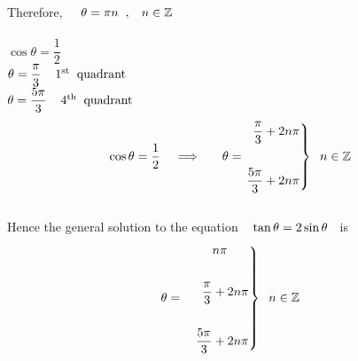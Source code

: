 \documentclass[11pt,a4paper]{article}
\begin{document}
Therefore, $\hspace{0.4cm} \theta = \pi n \hspace{0.2cm}, \hspace{0.3cm} n \in \mathbb{Z}$\\\\




$\cos \theta = \dfrac{1}{2}$\\

$\theta = \dfrac{\pi}{3}\hspace{0.4cm}1^{\text{st}}\hspace{0.2cm}\text{quadrant}$\\

$\theta = \dfrac{5\pi}{3}\hspace{0.4cm}4^{\text{th}}\hspace{0.2cm}\text{quadrant}$\\

$$\cos \theta = \dfrac{1}{2} \hspace{0.3cm} \implies \hspace{0.5cm} \theta = 
\left.\begin{aligned}
\dfrac{\pi}{3} & + 2n\pi\\\\
\dfrac{5\pi}{3} & + 2n\pi\\
\end{aligned}
\right\}\hspace{0.2cm} n \in \mathbb{Z}$$\\




Hence the general solution to the equation $\hspace{0.3cm} \tan \theta = 2\sin \theta\hspace{0.2cm}$ is 
\[\theta = \hspace{0.3cm} \left.\begin{aligned}
& n\pi\\\\
\dfrac{\pi}{3} & + 2n\pi\\\\
\dfrac{5\pi}{3} & + 2n\pi\\
\end{aligned}
\right\}\hspace{0.2cm} n \in \mathbb{Z}\]\\\\
\end{document}
